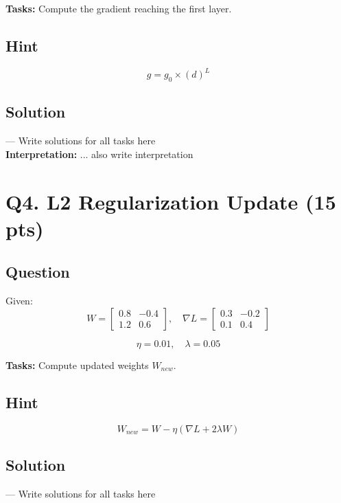 \documentclass[11pt]{article}
\begin{document}
\textbf{Tasks:} Compute the gradient reaching the first layer.

\subsection*{Hint}

\[
g=g_0\times(d)^L
\]

\subsection*{Solution}

--- Write solutions for all tasks here \\

\noindent \textbf{Interpretation:} ... also write interpretation

\section*{Q4. L2 Regularization Update (15 pts)}

\subsection*{Question}

Given:
\[
W=
\begin{bmatrix}
0.8 & -0.4\\
1.2 & 0.6
\end{bmatrix},
\quad
\nabla L=
\begin{bmatrix}
0.3 & -0.2\\
0.1 & 0.4
\end{bmatrix}
\]

\[
\eta=0.01,\quad \lambda=0.05
\]

\textbf{Tasks:} Compute updated weights $W_{new}$.

\subsection*{Hint}

\[
W_{new}=W-\eta(\nabla L+2\lambda W)
\]

\subsection*{Solution}

--- Write solutions for all tasks here \\
\end{document}
